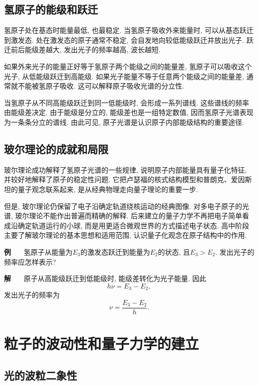 \documentclass[11pt,a4paper]{ctexbook}
\newcounter{exam}[chapter]
\newcommand{\bre}{\ \ \ }
\newcommand{\examlabel}{\textbf{例\theexam}}
\newcommand{\soln}{\textbf{解}\bre}
\newenvironment{example}{\bigskip\par\refstepcounter{exam}\examlabel\bre}{\par}
\newenvironment{solution}{\par\soln}{\par\bigskip}
\begin{document}
\subsection{氢原子的能级和跃迁}

氢原子处在基态时能量最低, 也最稳定. 当氢原子吸收外来能量时, 可以从基态跃迁到激发态. 处在激发态的原子通常不稳定, 会自发地向较低能级跃迁并放出光子. 跃迁前后能级差越大, 发出光子的频率越高, 波长越短.

如果外来光子的能量正好等于氢原子两个能级之间的能量差, 氢原子可以吸收这个光子, 从低能级跃迁到高能级. 如果光子能量不等于任意两个能级之间的能量差, 通常就不能被氢原子吸收. 这可以解释原子吸收光谱的分立性.

当氢原子从不同高能级跃迁到同一低能级时, 会形成一系列谱线. 这些谱线的频率由能级差决定. 由于能级是分立的, 能级差也是一组特定数值, 因而氢原子光谱表现为一条条分立的谱线. 由此可见, 原子光谱是认识原子内部能级结构的重要途径.

\subsection{玻尔理论的成就和局限}

玻尔理论成功解释了氢原子光谱的一些规律, 说明原子内部能量具有量子化特征, 并较好地解释了原子的稳定性问题. 它把卢瑟福的核式结构模型和普朗克、爱因斯坦的量子观念联系起来, 是从经典物理走向量子理论的重要一步.

但是, 玻尔理论仍保留了电子沿确定轨道绕核运动的经典图像. 对多电子原子的光谱, 玻尔理论不能作出普遍而精确的解释. 后来建立的量子力学不再把电子简单看成沿确定轨道运行的小球, 而是用更适合微观世界的方式描述电子状态. 高中阶段主要了解玻尔理论的基本思想和适用范围, 认识量子化观念在原子结构中的作用.

\begin{example}
氢原子从能量为$E_3$的激发态跃迁到能量为$E_2$的状态, 且$E_3>E_2$. 发出光子的频率应怎样表示?
\end{example}
\begin{solution}
原子从高能级跃迁到低能级时, 能级差转化为光子能量. 因此
$$h\nu=E_3-E_2,$$
发出光子的频率为
$$\nu=\frac{E_3-E_2}{h}.$$
\end{solution}

\section{粒子的波动性和量子力学的建立}

\subsection{光的波粒二象性}
\end{document}
